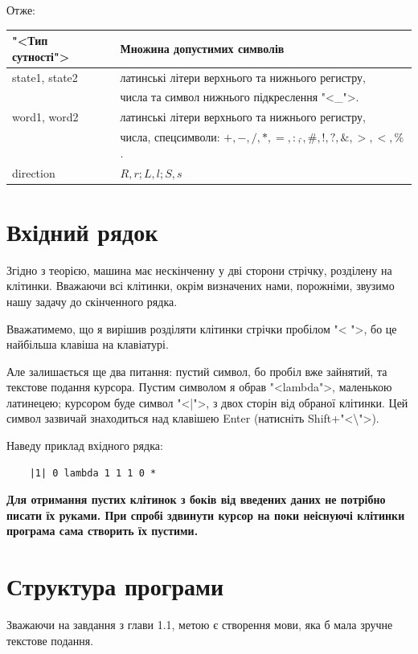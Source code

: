 \documentclass[oneside,final,14pt]{extreport}
\begin{document}
Отже:
		
\vspace{0.2cm}
		
\begin{tabular}{ | l | l | }
	\hline
	"<Тип сутності"> & Множина допустимих символів \\ \hline
	state1, state2 & латинські літери верхнього та нижнього регистру,\\
	& числа та символ нижнього підкреслення "<\_">. \\
	\hline
	word1, word2 & латинські літери верхнього та нижнього регистру,\\ 
	& числа, спецсимволи: $+,-,/,*,=,:,\hat{},\#,!,?,\&,>,<,\%$.  \\
	\hline
	direction & $R,r;L,l;S,s$ \\
	\hline
\end{tabular}

\section{Вхідний рядок}
Згідно з теорією, машина має нескінченну у дві сторони стрічку, розділену на клітинки. Вважаючи всі клітинки, окрім визначених нами, порожніми, звузимо нашу задачу до скінченного рядка.

Вважатимемо, що я вирішив розділяти клітинки стрічки пробілом "< ">, бо це найбільша клавіша на клавіатурі. 

Але залишається ще два питання: пустий символ, бо пробіл вже зайнятий, та текстове подання курсора. Пустим символом я обрав "<lambda">, маленькою латинецею; курсором буде символ "<|">, з двох сторін від обраної клітинки. Цей символ зазвичай знаходиться над клавішею Enter (натисніть Shift+"<\textbackslash{}">).

Наведу приклад вхідного рядка:
\begin{verbatim}
	|1| 0 lambda 1 1 1 0 *
\end{verbatim}

{\bfseries Для отримання пустих клітинок з боків від введених даних не потрібно писати їх руками. При спробі здвинути курсор на поки неіснуючі клітинки програма сама створить їх пустими.}

\section{Структура програми}
Зважаючи на завдання з глави 1.1, метою є створення мови, яка б мала зручне текстове подання.
\end{document}
